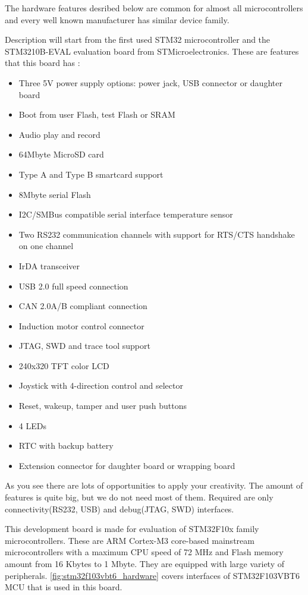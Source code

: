 The hardware features desribed below are common for almost all microcontrollers
and every well known manufacturer has similar device family.

Description will start from the first used STM32 microcontroller and
the STM3210B-EVAL evaluation board from STMicroelectronics.
These are features that this board has \cite{stm_eval_board_manual}:
\begin{itemize}
  \item Three 5V power supply options: power jack, USB connector or daughter
  board
  \item Boot from user Flash, test Flash or SRAM
  \item Audio play and record
  \item 64Mbyte MicroSD card
  \item Type A and Type B smartcard support
  \item 8Mbyte serial Flash
  \item I2C/SMBus compatible serial interface temperature sensor
  \item Two RS232 communication channels with support for RTS/CTS handshake on
  one channel
  \item IrDA transceiver
  \item USB 2.0 full speed connection
  \item CAN 2.0A/B compliant connection
  \item Induction motor control connector
  \item JTAG, SWD and trace tool support
  \item 240x320 TFT color LCD
  \item Joystick with 4-direction control and selector
  \item Reset, wakeup, tamper and user push buttons
  \item 4 LEDs
  \item RTC with backup battery
  \item Extension connector for daughter board or wrapping board 
\end{itemize}

As you see there are lots of opportunities to apply your creativity.
The amount of features is quite big, but we do not need most of them.
Required are only connectivity(RS232, USB) and debug(JTAG, SWD) interfaces.

This development board is made for evaluation of STM32F10x family
microcontrollers. These are ARM Cortex-M3 core-based mainstream microcontrollers
with a maximum CPU speed of 72 MHz and Flash memory amount from 16 Kbytes
to 1 Mbyte. They are equipped with large variety of peripherals.
\autoref{fig:stm32f103vbt6_hardware} covers interfaces of STM32F103VBT6 MCU that
is used in this board.

